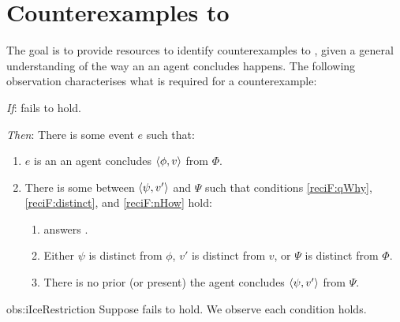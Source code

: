 \section{Counterexamples to \issueInclusion{}}


\begin{note}
  The goal is to provide resources to identify counterexamples to \issueInclusion{}, given a general understanding of the way an  an agent concludes happens.
  The following observation characterises what is required for a counterexample:

  \begin{observation}%
    \label{obs:iIceRestriction}%
    \vspace{-\baselineskip}
    \begin{itenum}
    \item[\emph{If}:]
      \issueInclusion{} fails to hold.
    \item[\emph{Then}:]
      There is some event \(e\) such that:
      \begin{enumerate}
      \item
        \(e\) is an  an agent concludes \(\langle\phi, v\rangle\) from \(\Phi\).
      \item
        There is some \fofr{} between \(\langle\psi, v'\rangle\) and \(\Psi\) such that conditions \ref{reciF:qWhy}, \ref{reciF:distinct}, and \ref{reciF:nHow} hold:
        \begin{enumerate}[label=\Alph*., ref=\Alph*]
        \item
          \label{reciF:qWhy}
           answers \qWhy{}.
        \item
          \label{reciF:distinct}
          Either \(\psi\) is distinct from \(\phi\), \(v'\) is distinct from \(v\), or \(\Psi\) is distinct from \(\Phi\).
        \item
          \label{reciF:nHow}
          There is no prior (or present)  the agent concludes \(\langle\psi, v'\rangle\) from \(\Psi\).
        \end{enumerate}
      \end{enumerate}
    \end{itenum}
    \vspace{-1.5\baselineskip}
  \end{observation}
  \begin{motivation}{obs:iIceRestriction}
    Suppose \issueInclusion{} fails to hold.
    We observe each condition holds.


\end{motivation}
\end{note}
